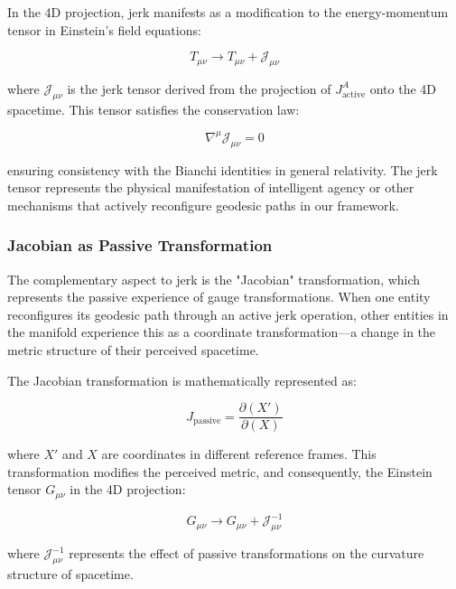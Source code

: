 \documentclass{article}
\begin{document}
In the 4D projection, jerk manifests as a modification to the energy-momentum tensor in Einstein's field equations:

\begin{equation}
T_{\mu\nu} \rightarrow T_{\mu\nu} + \mathcal{J}_{\mu\nu}
\end{equation}

where $\mathcal{J}_{\mu\nu}$ is the jerk tensor derived from the projection of $J^A_{\text{active}}$ onto the 4D spacetime. This tensor satisfies the conservation law:

\begin{equation}
\nabla^{\mu} \mathcal{J}_{\mu\nu} = 0
\end{equation}

ensuring consistency with the Bianchi identities in general relativity. The jerk tensor represents the physical manifestation of intelligent agency or other mechanisms that actively reconfigure geodesic paths in our framework.

\subsubsection{Jacobian as Passive Transformation}

The complementary aspect to jerk is the "Jacobian" transformation, which represents the passive experience of gauge transformations. When one entity reconfigures its geodesic path through an active jerk operation, other entities in the manifold experience this as a coordinate transformation—a change in the metric structure of their perceived spacetime.

The Jacobian transformation is mathematically represented as:

\begin{equation}
J_{\text{passive}} = \frac{\partial (X')}{\partial (X)}
\end{equation}

where $X'$ and $X$ are coordinates in different reference frames. This transformation modifies the perceived metric, and consequently, the Einstein tensor $G_{\mu\nu}$ in the 4D projection:

\begin{equation}
G_{\mu\nu} \rightarrow G_{\mu\nu} + \mathcal{J}^{-1}_{\mu\nu}
\end{equation}

where $\mathcal{J}^{-1}_{\mu\nu}$ represents the effect of passive transformations on the curvature structure of spacetime.
\end{document}

